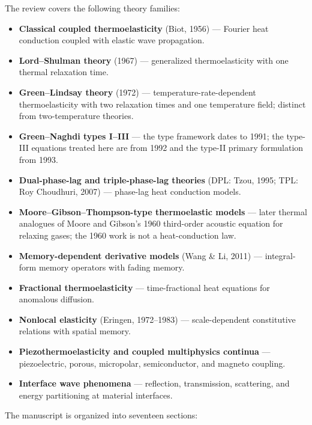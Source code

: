 The review covers the following theory families:

\begin{itemize}
\item \textbf{Classical coupled thermoelasticity} (Biot, 1956) — Fourier heat conduction coupled with elastic wave propagation.
\item \textbf{Lord--Shulman theory} (1967) — generalized thermoelasticity with one thermal relaxation time.
\item \textbf{Green--Lindsay theory} (1972) — temperature-rate-dependent thermoelasticity with two relaxation times and one temperature field; distinct from two-temperature theories.
\item \textbf{Green--Naghdi types I--III} — the type framework dates to 1991; the type-III equations treated here are from 1992 and the type-II primary formulation from 1993.
\item \textbf{Dual-phase-lag and triple-phase-lag theories} (DPL: Tzou, 1995; TPL: Roy Choudhuri, 2007) — phase-lag heat conduction models.
\item \textbf{Moore--Gibson--Thompson-type thermoelastic models} — later thermal analogues of Moore and Gibson's 1960 third-order acoustic equation for relaxing gases; the 1960 work is not a heat-conduction law.
\item \textbf{Memory-dependent derivative models} (Wang \& Li, 2011) — integral-form memory operators with fading memory.
\item \textbf{Fractional thermoelasticity} — time-fractional heat equations for anomalous diffusion.
\item \textbf{Nonlocal elasticity} (Eringen, 1972--1983) — scale-dependent constitutive relations with spatial memory.
\item \textbf{Piezothermoelasticity and coupled multiphysics continua} — piezoelectric, porous, micropolar, semiconductor, and magneto coupling.
\item \textbf{Interface wave phenomena} — reflection, transmission, scattering, and energy partitioning at material interfaces.
\end{itemize}

The manuscript is organized into seventeen sections:

